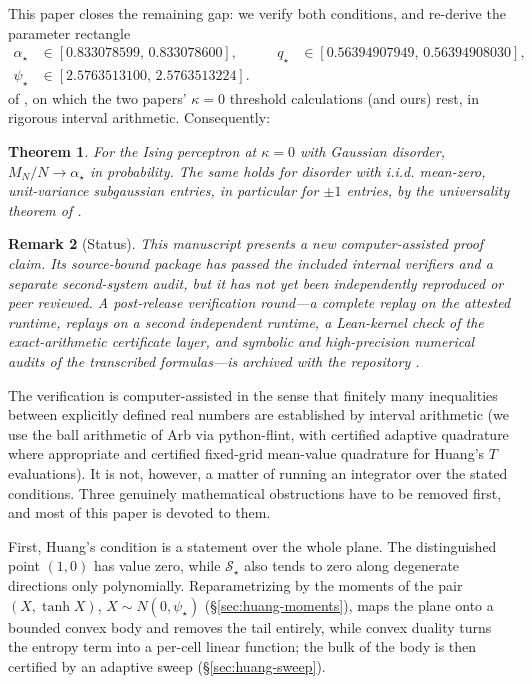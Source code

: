 \documentclass[11pt]{article}
\newtheorem{theorem}{Theorem}[section]
\newtheorem{remark}[theorem]{Remark}
\begin{document}
This paper closes the remaining gap: we verify both conditions, and
re-derive the parameter rectangle
\[
\begin{aligned}
  \alpha_\star &\in [0.833078599,\, 0.833078600], \qquad&
  q_\star &\in [0.56394907949,\, 0.56394908030],\\
  \psi_\star &\in [2.5763513100,\, 2.5763513224]. &&
\end{aligned}
\]
of \cite[Proposition~1.3]{ding2018capacity}, on which the two papers'
$\kappa=0$ threshold calculations (and ours) rest, in rigorous interval
arithmetic. Consequently:

\begin{theorem}\label{thm:main}
For the Ising perceptron at $\kappa = 0$ with Gaussian disorder,
$M_N/N \to \alpha_\star$ in probability. The same holds for disorder with
i.i.d. mean-zero, unit-variance subgaussian entries, in particular for $\pm 1$
entries, by the universality theorem of \cite{nakajima2023sharp}.
\end{theorem}

\begin{remark}[Status]
This manuscript presents a new computer-assisted proof claim. Its
source-bound package has passed the included internal verifiers and a separate
second-system audit, but it has not yet been independently reproduced or peer
reviewed. A post-release verification round---a complete replay on the
attested runtime, replays on a second independent runtime, a Lean-kernel
check of the exact-arithmetic certificate layer, and symbolic and
high-precision numerical audits of the transcribed formulas---is archived
with the repository \cite{repo}.
\end{remark}

The verification is computer-assisted in the sense that finitely many
inequalities between explicitly defined real numbers are established by
interval arithmetic (we use the ball arithmetic of Arb via python-flint,
with certified adaptive quadrature where appropriate and certified fixed-grid
mean-value quadrature for Huang's $T$ evaluations). It is not, however,
a matter of running an integrator over the stated conditions. Three
genuinely mathematical obstructions have to be removed first, and most of
this paper is devoted to them.

First, Huang's condition is a statement over the whole plane. The
distinguished point $(1,0)$ has value zero, while $\mathcal{S}_\star$ also tends to zero along
degenerate directions only polynomially. Reparametrizing by the
moments of the pair $(X,\tanh X)$, $X\sim N(0,\psi_\star)$
(\S\ref{sec:huang-moments}), maps the plane onto a bounded convex body and
removes the tail entirely, while convex duality turns the entropy term into
a per-cell linear function; the bulk of the body is then certified by an
adaptive sweep (\S\ref{sec:huang-sweep}).
\end{document}
